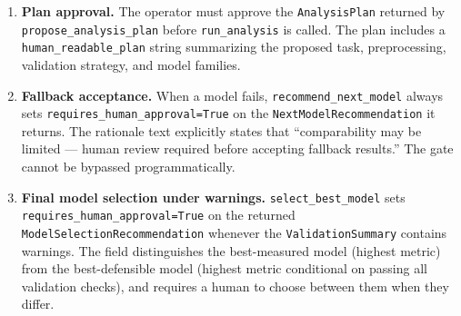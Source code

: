 \begin{enumerate}
  \item \textbf{Plan approval.} The operator must approve the
    \texttt{AnalysisPlan} returned by \texttt{propose\_analysis\_plan} before
    \texttt{run\_analysis} is called.
    The plan includes a \texttt{human\_readable\_plan} string summarizing the
    proposed task, preprocessing, validation strategy, and model families.

  \item \textbf{Fallback acceptance.} When a model fails, \texttt{recommend\_next\_model}
    always sets \texttt{requires\_human\_approval=True} on the
    \texttt{NextModelRecommendation} it returns.
    The rationale text explicitly states that ``comparability may be limited ---
    human review required before accepting fallback results.''
    The gate cannot be bypassed programmatically.

  \item \textbf{Final model selection under warnings.} \texttt{select\_best\_model}
    sets \texttt{requires\_human\_approval=True} on the returned
    \texttt{ModelSelectionRecommendation} whenever the \texttt{ValidationSummary}
    contains warnings.
    The field distinguishes the best-measured model (highest metric) from the
    best-defensible model (highest metric conditional on passing all validation
    checks), and requires a human to choose between them when they differ.
\end{enumerate}
